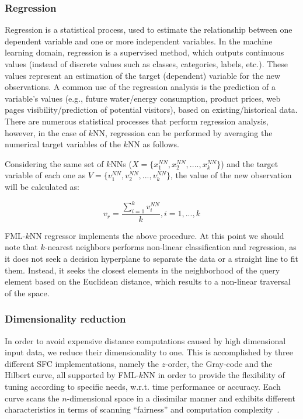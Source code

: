 \subsubsection{Regression}
\label{subsec:regression}
Regression is a statistical process, used to estimate the relationship between one dependent variable and one or more independent variables. In the machine learning domain, regression is a supervised method, which outputs continuous values (instead of discrete values such as classes, categories, labels, etc.). These values represent an estimation of the target (dependent) variable for the new observations. A common use of the regression analysis is the prediction of a variable's values (e.g., future water/energy consumption, product prices, web pages visibility/prediction of potential visitors), based on existing/historical data. There are numerous statistical processes that perform regression analysis, however, in the case of $k$NN, regression can be performed by averaging the numerical target variables of the $k$NN as follows.

Considering the same set of $k$NNs ($X = \{x_{1}^{NN}, x_{2}^{NN}, ...., x_{k}^{NN}\}$) and the target variable of each one as $V = \{v_{1}^{NN}, v_{2}^{NN}, ..., v_{k}^{NN}\}$, the value of the new observation will be calculated as:

\begin{equation}
	v_{r} = \frac{\sum_{i=1}^{k} v_{i}^{NN}}{k}, i=1, ..., k
\end{equation}

FML-$k$NN regressor implements the above procedure. At this point we should note that $k$-nearest neighbors performs non-linear classification and regression, as it does not seek a decision hyperplane to separate the data or a straight line to fit them. Instead, it seeks the closest elements in the neighborhood of the query element based on the Euclidean distance, which results to a non-linear traversal of the space.

\subsubsection{Dimensionality reduction}
\label{subsec:dim_red}
In order to avoid expensive distance computations caused by high dimensional input data, we reduce their dimensionality to one. This is accomplished by three different SFC implementations, namely the $z$-order, the Gray-code and the Hilbert curve, all supported by FML-$k$NN in order to provide the flexibility of tuning according to specific needs, w.r.t. time performance or accuracy. Each curve scans the $n$-dimensional space in a dissimilar manner and exhibits different characteristics in terms of scanning ``fairness'' and computation complexity~\cite{mokbel2002pms}.

